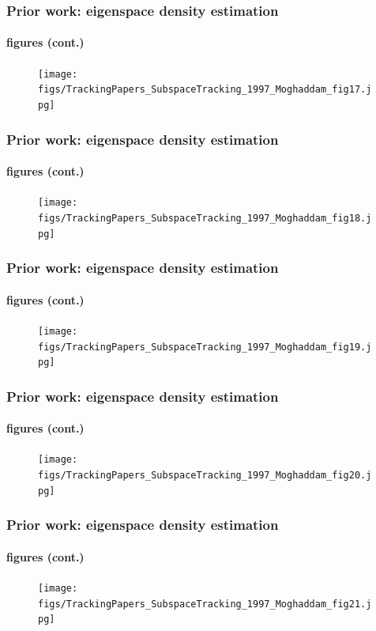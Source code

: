 \begin{frame}
\frametitle{Prior work: eigenspace density estimation}
\framesubtitle{figures (cont.)}
\mypagenum
	\begin{figure}
		\texttt{[image: figs/TrackingPapers\_SubspaceTracking\_1997\_Moghaddam\_fig17.jpg]}
	\end{figure}
\end{frame}



\begin{frame}
\frametitle{Prior work: eigenspace density estimation}
\framesubtitle{figures (cont.)}
\mypagenum
	\begin{figure}
		\texttt{[image: figs/TrackingPapers\_SubspaceTracking\_1997\_Moghaddam\_fig18.jpg]}
	\end{figure}
\end{frame}



\begin{frame}
\frametitle{Prior work: eigenspace density estimation}
\framesubtitle{figures (cont.)}
\mypagenum
	\begin{figure}
		\texttt{[image: figs/TrackingPapers\_SubspaceTracking\_1997\_Moghaddam\_fig19.jpg]}
	\end{figure}
\end{frame}



\begin{frame}
\frametitle{Prior work: eigenspace density estimation}
\framesubtitle{figures (cont.)}
\mypagenum
	\begin{figure}
		\texttt{[image: figs/TrackingPapers\_SubspaceTracking\_1997\_Moghaddam\_fig20.jpg]}
	\end{figure}
\end{frame}



\begin{frame}
\frametitle{Prior work: eigenspace density estimation}
\framesubtitle{figures (cont.)}
\mypagenum
	\begin{figure}
		\texttt{[image: figs/TrackingPapers\_SubspaceTracking\_1997\_Moghaddam\_fig21.jpg]}
	\end{figure}
\end{frame}





